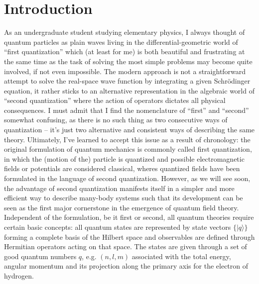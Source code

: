
\chapter*{Introduction}
\label{ch:introduction}
As an undergraduate student studying elementary physics, I always thought of quantum particles as plain waves living in the differential-geometric world of ``first quan\-ti\-zation'' which (at least for me) is both beautiful and frustrating at the same time as the task of solving the most simple problems may become quite involved, if not even impossible.
The modern approach is not a straightforward attempt to solve the real-space wave function by integrating a given Schrödinger equation, it rather sticks to an alternative representation in the algebraic world of ``second quantization'' where the action of operators dictates all physical consequences.
I must admit that I find the nomenclature of ``first'' and ``second'' somewhat confusing, as there is no such thing as two consecutive ways of quantization -- it's just two alternative and consistent ways of describing the same theory.
Ultimately, I've learned to accept this issue as a result of chronology: the original formulation of quantum mechanics is commonly called first quantization, in which the (motion of the) particle is quantized and possible electromagnetic fields or potentials are considered classical, wheres quantized fields have been formulated in the language of second quantization.
However, as we will see soon, the advantage of second quantization manifests itself in a simpler and more efficient way to describe many-body systems such that its development can be seen as the first major cornerstone in the emergence of quantum field theory.
\\

Independent of the formulation, be it first or second, all quantum theories require certain basic concepts:
all quantum states are represented by state vectors $\{|q\rangle\}$ forming a complete basis of the Hilbert space and observables are defined through Hermitian operators acting on that space.
The states are given through a set of good quantum numbers $q$, e.g. $(n,l,m)$ associated with the total energy, angular momentum and its projection along the primary axis for the electron of hydrogen.
\\

